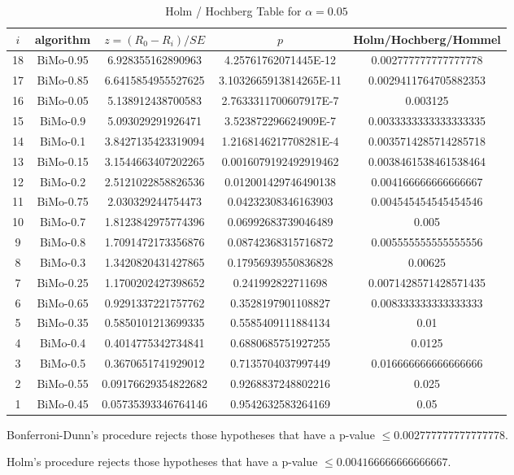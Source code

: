 \documentclass[a4paper,10pt]{article}
\begin{document}
\begin{landscape}
\begin{table}[!htp]
\centering\tiny
\caption{Holm / Hochberg Table for $\alpha=0.05$}
\begin{tabular}{ccccc}
$i$&algorithm&$z=(R_0 - R_i)/SE$&$p$&Holm/Hochberg/Hommel\\
\hline
18&BiMo-0.95&6.928355162890963&4.25761762071445E-12&0.002777777777777778\\
17&BiMo-0.85&6.6415854955527625&3.1032665913814265E-11&0.0029411764705882353\\
16&BiMo-0.05&5.138912438700583&2.7633311700607917E-7&0.003125\\
15&BiMo-0.9&5.093029291926471&3.523872296624909E-7&0.0033333333333333335\\
14&BiMo-0.1&3.8427135423319094&1.2168146217708281E-4&0.0035714285714285718\\
13&BiMo-0.15&3.1544663407202265&0.0016079192492919462&0.0038461538461538464\\
12&BiMo-0.2&2.5121022858826536&0.012001429746490138&0.004166666666666667\\
11&BiMo-0.75&2.030329244754473&0.04232308346163903&0.004545454545454546\\
10&BiMo-0.7&1.8123842975774396&0.06992683739046489&0.005\\
9&BiMo-0.8&1.7091472173356876&0.08742368315716872&0.005555555555555556\\
8&BiMo-0.3&1.3420820431427865&0.17956939550836828&0.00625\\
7&BiMo-0.25&1.1700202427398652&0.241992822711698&0.0071428571428571435\\
6&BiMo-0.65&0.9291337221757762&0.3528197901108827&0.008333333333333333\\
5&BiMo-0.35&0.5850101213699335&0.5585409111884134&0.01\\
4&BiMo-0.4&0.4014775342734841&0.6880685751927255&0.0125\\
3&BiMo-0.5&0.3670651741929012&0.7135704037997449&0.016666666666666666\\
2&BiMo-0.55&0.09176629354822682&0.9268837248802216&0.025\\
1&BiMo-0.45&0.05735393346764146&0.9542632583264169&0.05\\
\hline
\end{tabular}
\end{table}
Bonferroni-Dunn's procedure rejects those hypotheses that have a p-value $\le0.002777777777777778$.


Holm's procedure rejects those hypotheses that have a p-value $\le0.004166666666666667$.



\end{landscape}
\end{document}
